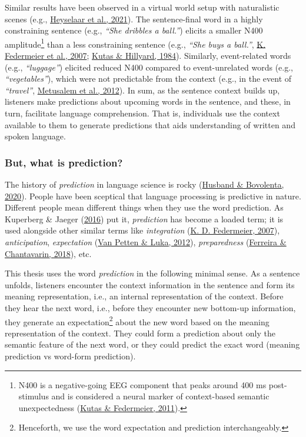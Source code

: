 \documentclass[a4paper, nobind]{templates/ociamthesis}
\begin{document}
Similar results have been observed in a virtual world setup with naturalistic scenes (e.g., \protect\hyperlink{ref-Heyselaar2021}{Heyselaar et al., 2021}).
The sentence-final word in a highly constraining sentence (e.g., \emph{``She dribbles a ball.''}) elicits a smaller N400 amplitude\footnote{N400 is a negative-going EEG component that peaks around 400 ms post-stimulus and is considered a neural marker of context-based semantic unexpectedness (\protect\hyperlink{ref-Kutas2011}{Kutas \& Federmeier, 2011}).} than a less constraining sentence (e.g., \emph{``She buys a ball.''}, \protect\hyperlink{ref-Federmeier2007}{K. Federmeier et al., 2007}; \protect\hyperlink{ref-Kutas1984}{Kutas \& Hillyard, 1984}).
Similarly, event-related words (e.g., \emph{``luggage''}) elicited reduced N400 compared to event-unrelated words (e.g., \emph{``vegetables''}), which were not predictable from the context (e.g., in the event of \emph{``travel''}, \protect\hyperlink{ref-Metusalem2012}{Metusalem et al., 2012}).
In sum, as the sentence context builds up, listeners make predictions about upcoming words in the sentence, and these, in turn, facilitate language comprehension.
That is, individuals use the context available to them to generate predictions that aids understanding of written and spoken language.

\hypertarget{but-what-is-prediction}{%
\subsubsection{But, what is prediction?}\label{but-what-is-prediction}}

\noindent
The history of \emph{prediction} in language science is rocky (\protect\hyperlink{ref-Husband2020}{Husband \& Bovolenta, 2020}).
People have been sceptical that language processing is predictive in nature.
Different people mean different things when they use the word prediction.
As Kuperberg \& Jaeger (\protect\hyperlink{ref-Kuperberg2016}{2016}) put it, \emph{prediction} has become a loaded term;
it is used alongside other similar terms like \emph{integration} (\protect\hyperlink{ref-Federmeier2007a}{K. D. Federmeier, 2007}), \emph{anticipation}, \emph{expectation} (\protect\hyperlink{ref-VanPetten2012}{Van Petten \& Luka, 2012}), \emph{preparedness} (\protect\hyperlink{ref-Ferreira2018}{Ferreira \& Chantavarin, 2018}), etc.

This thesis uses the word \emph{prediction} in the following minimal sense.
As a sentence unfolds, listeners encounter the context information in the sentence and form its meaning representation, i.e.,
an internal representation of the context.
Before they hear the next word, i.e., before they encounter new bottom-up information,
they generate an expectation\footnote{Henceforth, we use the word expectation and prediction interchangeably.
} about the new word based on the meaning representation of the context.
They could form a prediction about only the semantic feature of the next word,
or they could predict the exact word (meaning prediction vs word-form prediction).
\end{document}
